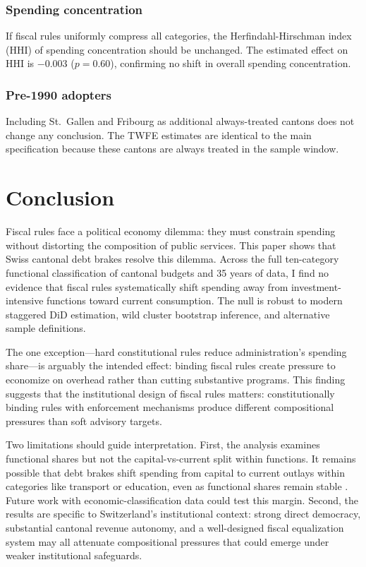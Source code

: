 \documentclass[12pt]{article}
\begin{document}
\subsubsection*{Spending concentration} If fiscal rules uniformly compress all categories, the Herfindahl-Hirschman index (HHI) of spending concentration should be unchanged. The estimated effect on HHI is $-0.003$ ($p = 0.60$), confirming no shift in overall spending concentration.

\subsubsection*{Pre-1990 adopters} Including St.\ Gallen and Fribourg as additional always-treated cantons does not change any conclusion. The TWFE estimates are identical to the main specification because these cantons are always treated in the sample window.


\section{Conclusion}\label{sec:conclusion}

Fiscal rules face a political economy dilemma: they must constrain spending without distorting the composition of public services. This paper shows that Swiss cantonal debt brakes resolve this dilemma. Across the full ten-category functional classification of cantonal budgets and 35 years of data, I find no evidence that fiscal rules systematically shift spending away from investment-intensive functions toward current consumption. The null is robust to modern staggered DiD estimation, wild cluster bootstrap inference, and alternative sample definitions.

The one exception---hard constitutional rules reduce administration's spending share---is arguably the intended effect: binding fiscal rules create pressure to economize on overhead rather than cutting substantive programs. This finding suggests that the institutional design of fiscal rules matters: constitutionally binding rules with enforcement mechanisms produce different compositional pressures than soft advisory targets.

Two limitations should guide interpretation. First, the analysis examines functional shares but not the capital-vs-current split within functions. It remains possible that debt brakes shift spending from capital to current outlays within categories like transport or education, even as functional shares remain stable \citep{baskaran2016revenue}. Future work with economic-classification data could test this margin. Second, the results are specific to Switzerland's institutional context: strong direct democracy, substantial cantonal revenue autonomy, and a well-designed fiscal equalization system may all attenuate compositional pressures that could emerge under weaker institutional safeguards.
\end{document}
